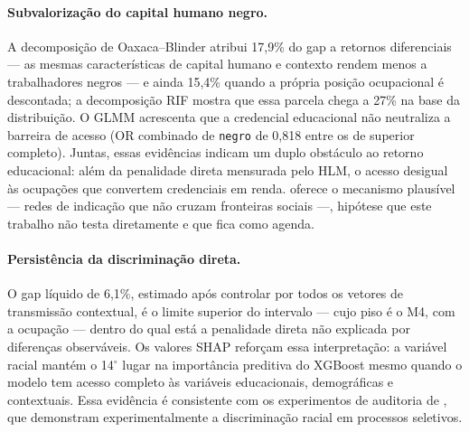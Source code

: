 \documentclass[11pt, a4paper, oneside]{article}
\begin{document}
\paragraph{Subvalorização do capital humano negro.}
A decomposição de Oaxaca--Blinder atribui 17,9\% do gap a {retornos}
diferenciais --- as mesmas características de capital humano e contexto rendem
menos a trabalhadores negros --- e ainda 15,4\% quando a própria posição
ocupacional é descontada; a decomposição RIF mostra que essa parcela chega a 27\%
na base da distribuição. O GLMM acrescenta que a
credencial educacional não neutraliza a barreira de acesso (OR combinado de
\texttt{negro} de 0,818 entre os de superior completo). Juntas, essas evidências indicam
um duplo obstáculo ao retorno educacional: além da penalidade direta mensurada
pelo HLM, o acesso desigual às ocupações que convertem credenciais em renda.
 oferece o mecanismo plausível --- redes de indicação
que não cruzam fronteiras sociais ---, hipótese que este trabalho não testa
diretamente e que fica como agenda.

\paragraph{Persistência da discriminação direta.}
O gap líquido de 6,1\%, estimado após controlar por todos os vetores
de transmissão contextual, é o limite superior do intervalo --- cujo piso é o
M4, com a ocupação --- dentro do qual está a penalidade direta não explicada por
diferenças observáveis. Os valores SHAP reforçam essa
interpretação: a variável racial mantém o 14$^\circ$ lugar
na importância preditiva do XGBoost mesmo quando o modelo tem acesso
completo às variáveis educacionais, demográficas e contextuais.
Essa evidência é consistente com os experimentos de auditoria de
, que demonstram experimentalmente a discriminação
racial em processos seletivos.
\end{document}
